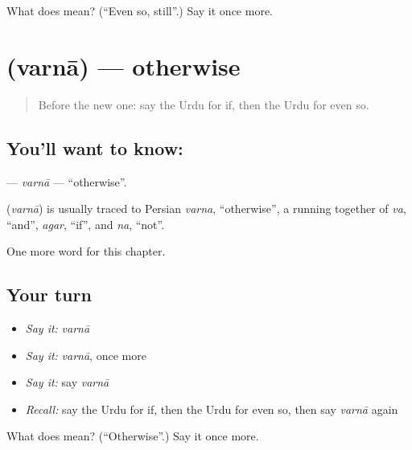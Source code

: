 \begin{tcolorbox}[breakable,colback=teal!4,colframe=teal!35!black,title={Before you move on}]
What does   mean? (\textquotedblleft{}Even so, still\textquotedblright{}.) Say it once more.
\end{tcolorbox}
\section[\texorpdfstring{\ur{ورنہ} (varnā)}{ورنہ (varnā)}]{ (varnā) — otherwise}

\label{lesson:UR-C159-varna}



\begin{quote}
Before the new one: say the Urdu for if, then the Urdu for even so.
\end{quote}

\subsection*{You'll want to know: }
\textbf{} — \emph{varnā} — \textquotedblleft{}otherwise\textquotedblright{}.

\begin{cousinweb}
\textbf{} (\emph{varnā}) is usually traced to Persian \emph{varna}, \textquotedblleft{}otherwise\textquotedblright{}, a running together of \emph{va}, \textquotedblleft{}and\textquotedblright{}, \emph{agar}, \textquotedblleft{}if\textquotedblright{}, and \emph{na}, \textquotedblleft{}not\textquotedblright{}.
\end{cousinweb}

\begin{grammarlens}[title={What you've built}]
One more word for this chapter.
\end{grammarlens}

\subsection*{Your turn}
\begin{itemize}
\raggedright
  \item \emph{Say it:} \emph{varnā}
  \item \emph{Say it:} \emph{varnā}, once more
  \item \emph{Say it:} say \emph{varnā}
  \item \emph{Recall:} say the Urdu for if, then the Urdu for even so, then say \emph{varnā} again
\end{itemize}

\begin{tcolorbox}[breakable,colback=teal!4,colframe=teal!35!black,title={Before you move on}]
What does  mean? (\textquotedblleft{}Otherwise\textquotedblright{}.) Say it once more.
\end{tcolorbox}

